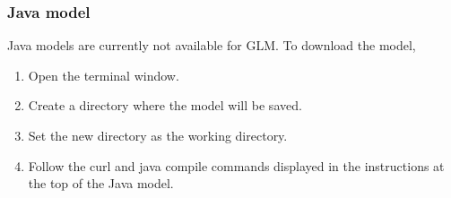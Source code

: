 \documentclass{article}[11pt]
\begin{document}
\subsubsection{Java model} %
Java models are currently not available for GLM.
To download the model, 
\begin{enumerate}
\item Open the terminal window. 
\item Create a directory where the model will be saved.
\item Set the new directory as the working directory.
\item Follow the curl and java compile commands displayed in the instructions at the top of the Java model.
\end{enumerate}
\newpage
\end{document}
